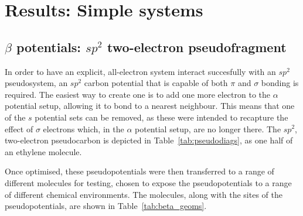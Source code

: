 \documentclass[aip,reprint,nofootinbib]{revtex4-1}
\begin{document}
\section{Results: Simple systems} 
\label{sec:simplesystems}

\subsection{$\beta$ potentials: $sp^{2}$ two-electron pseudofragment}

In order to have an explicit, all-electron system interact succesfully with an $sp^2$ pseudosystem, an $sp^2$ carbon potential that is capable of both $\pi$ and $\sigma$ bonding is required. The easiest way to create one is to add one more electron to the $\alpha$ potential setup, allowing it to bond to a nearest neighbour. This means that one of the $s$ potential sets can be removed, as these were intended to recapture the effect of $\sigma$ electrons which, in the $\alpha$ potential setup, are no longer there. The $sp^2$, two-electron pseudocarbon is depicted in Table~\ref{tab:pseudodiags}, as one half of an ethylene molecule.

Once optimised, these pseudopotentials were then transferred to a range of different molecules for testing, chosen to expose the pseudopotentials to a range of different chemical environments. The molecules, along with the sites of the pseudopotentials, are shown in Table~\ref{tab:beta_geoms}.
\end{document}
